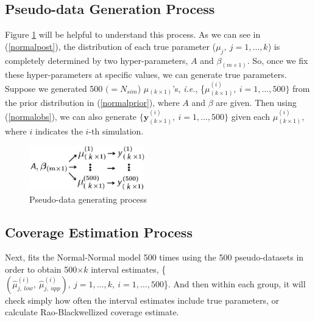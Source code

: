 \documentclass[article]{jss}
\begin{document}
\subsection{Pseudo-data Generation Process}
Figure \ref{fig:pseudo} will be helpful to understand this process. As we can see in (\ref{normalpost}), the distribution of each true parameter ($\mu_{j},~j=1,\ldots, k$) is completely determined by two hyper-parameters, $A$ and $\beta_{(m\times1)}$. So, once we fix these hyper-parameters at specific values, we can generate true parameters. Suppose we generated 500 $(=N_{sim}$) {\boldmath $\mu$}$_{(k\times1)}$'s, \emph{i.e.}, \{{\boldmath $\mu$}$^{(i)}_{(k\times1)},~i=1, \ldots, 500\}$ from the prior distribution in (\ref{normalprior}), where $A$ and $\beta$ are given. Then using (\ref{normalobs}), we can also generate $\{\mathbf{y}^{(i)}_{(k\times1)},~i=1, \ldots, 500\}$ given each {\boldmath$\mu$}$^{(i)}_{(k\times1)}, $ where $i$ indicates the $i$-th simulation. 

\begin{figure}[h]
\begin{center}
\includegraphics[width=5cm]{process.png}
\caption{Pseudo-data generating process}
\label{fig:pseudo}
\end{center}
\end{figure}

\subsection{Coverage Estimation Process}
Next,  fits the Normal-Normal model 500 times using the 500 pseudo-datasets in order to obtain 500$\times k$ interval estimates,  \{$(\hat{\mu}^{(i)}_{j, ~low}, ~\hat{\mu}^{(i)}_{j, ~upp}), ~j=1,\ldots, k,~ i=1, \ldots, 500$\}.  And then within each group, it will check simply how often the interval estimates include true parameters, or calculate Rao-Blackwellized coverage estimate. 
\end{document}
